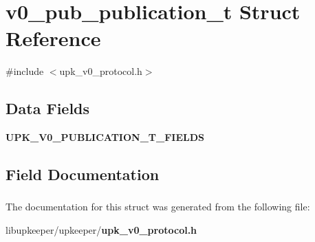 \section{v0\_\-pub\_\-publication\_\-t Struct Reference}
\label{structv0__pub__publication__t}


{\ttfamily \#include $<$upk\_\-v0\_\-protocol.h$>$}

\subsection*{Data Fields}
\begin{DoxyCompactItemize}
\item 
{\bf UPK\_\-V0\_\-PUBLICATION\_\-T\_\-FIELDS}
\end{DoxyCompactItemize}


\subsection{Field Documentation}
\subsubsection[{UPK\_\-V0\_\-PUBLICATION\_\-T\_\-FIELDS}]{}\label{structv0__pub__publication__t_a6c51a079cf827fb5afb5ebddf0e05f39}


The documentation for this struct was generated from the following file:\begin{DoxyCompactItemize}
\item 
libupkeeper/upkeeper/{\bf upk\_\-v0\_\-protocol.h}\end{DoxyCompactItemize}
